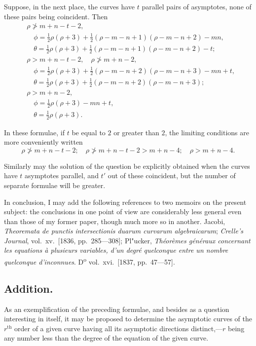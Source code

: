 \documentclass[11pt,a4paper]{book}
\begin{document}
Suppose, in the next place, the curves have $t$ parallel pairs of asymptotes, none of
these pairs being coincident. Then
\begin{align*}
&\rho \not> m+n-t-2, \\
&\quad \phi = \tfrac{1}{2}\rho(\rho+3) + \tfrac{1}{2}(\rho-m-n+1)(\rho-m-n+2) - mn, \\
&\quad \theta = \tfrac{1}{2}\rho(\rho+3) + \tfrac{1}{2}(\rho-m-n+1)(\rho-m-n+2) - t;\\[6pt]
&\rho > m+n-t-2, \quad \rho \not> m+n-2, \\
&\quad \phi = \tfrac{1}{2}\rho(\rho+3) + \tfrac{1}{2}(\rho-m-n+2)(\rho-m-n+3) - mn + t, \\
&\quad \theta = \tfrac{1}{2}\rho(\rho+3) + \tfrac{1}{2}(\rho-m-n+2)(\rho-m-n+3);\\[6pt]
&\rho > m+n-2, \\
&\quad \phi = \tfrac{1}{2}\rho(\rho+3) - mn + t, \\
&\quad \theta = \tfrac{1}{2}\rho(\rho+3).
\end{align*}

In these formulae, if $t$ be equal to $2$ or greater than $2$, the limiting conditions are
more conveniently written
\[
\rho \not> m+n-t-2; \quad \rho \not> m+n-t-2 > m+n-4; \quad \rho > m+n-4.
\]

Similarly may the solution of the question be explicitly obtained when the curves
have $t$ asymptotes parallel, and $t'$ out of these coincident, but the number of separate
formulae will be greater.

In conclusion, I may add the following references to two memoirs on the present
subject: the conclusions in one point of view are considerably less general even than
those of my former paper, though much more so in another. Jacobi, \textit{Theoremata de
punctis intersectionis duarum curvarum algebraicarum}; \textit{Crelle's Journal}, vol.~xv.\ [1836,
pp.~285---308]; Pl"{u}cker, \textit{Th\'{e}or\`{e}mes g\'{e}n\'{e}raux concernant les equations \`{a} plusieurs variables,
d'un degr\'{e} quelconque entre un nombre quelconque d'inconnues}. D\textsuperscript{o} vol.~xvi.\ [1837,
pp.~47---57].

\newpage
\subsection*{Addition.}

As an exemplification of the preceding formulae, and besides as a question interesting
in itself, it may be proposed to determine the asymptotic curves of the $r^{\text{th}}$ order of
a given curve having all its asymptotic directions distinct,---$r$ being any number less
than the degree of the equation of the given curve.
\end{document}
